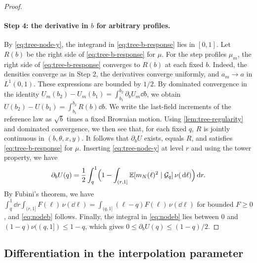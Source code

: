 \begin{proof}
\paragraph{Step 4: the derivative in $b$ for arbitrary profiles.}
By \eqref{eq:tree-node-y}, the integrand in \eqref{eq:tree-b-response}
lies in $[0,1]$. Let $R(b)$ be the right side of
\eqref{eq:tree-b-response} for $\mu$. For the step profiles $\mu_m$, the
right side of \eqref{eq:tree-b-response} converges to $R(b)$ at each
fixed $b$. Indeed, the densities converge as in Step 2, the derivatives
converge uniformly, and $a_m\to a$ in $L^1(0,1)$. These expressions are
bounded by $1/2$. By dominated convergence in the identity
$U_m(b_2)-U_m(b_1)=\int_{b_1}^{b_2}\partial_bU_m\dd b$, we obtain
$U(b_2)-U(b_1)=\int_{b_1}^{b_2}R(b)\dd b$. We write the last-field
increments of the reference law as $\sqrt b$ times a fixed Brownian
motion. Using \cref{lem:tree-regularity} and dominated convergence, we then see
that, for each fixed $q$, $R$ is jointly continuous in
$(b,\theta,x,y)$. It follows that
$\partial_bU$ exists, equals $R$, and satisfies
\eqref{eq:tree-b-response} for $\mu$. Inserting \eqref{eq:tree-node-y}
at level $r$ and using the tower property, we have
\[
 \partial_bU(q)=\frac12\int_q^1\Bigl(1-\int_{(r,1]}
   \mathbb E[m_N(\ell)^2\mid\mathcal G_q]\,\nu(\,\mathrm d\ell)\Bigr)\,\mathrm d r .
\]
By Fubini's theorem, we have $\int_q^1\dd r\int_{(r,1]}F(\ell)\,\nu(\dd\ell)
=\int_{(q,1]}(\ell-q)F(\ell)\,\nu(\dd\ell)$ for bounded $F\ge0$, and
\eqref{eq:nodeb} follows. Finally, the integral in \eqref{eq:nodeb} lies
between $0$ and $(1-q)\nu((q,1])\le1-q$, which gives
$0\le\partial_bU(q)\le(1-q)/2$.
\end{proof}

\subsection{Differentiation in the interpolation parameter}

